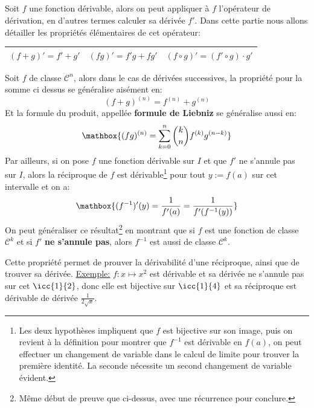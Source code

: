 \subsection*{}

Soit \(f\) une fonction dérivable, alors on peut appliquer à \(f\) l'opérateur de dérivation, en d'autres termes calculer sa dérivée \(f'\). Dans cette partie nous allons détailler les propriétés élémentaires de cet opérateur:
\begin{center}
   \renewcommand{\arraystretch}{1.5}%
   \begin{tabular}{| c | c | c |}
   \hline
   \((f + g)' = f' + g'\) & \((fg)' = f'g + fg'\)  & \((f \circ g)' = (f' \circ g) \cdot g'\) \\ [1ex]
   \hline
   \end{tabular}
\end{center}  
Soit \(f\) de classe \(\mathscr{C}^n\), alors dans le cas de dérivées successives, la propriété pour la somme ci dessus se généralise aisément en:
\[
   (f + g)^{(n)} = f^{(n)} + g^{(n)}
\]
Et la formule du produit, appellée \textbf{formule de Liebniz} se généralise aussi en:
\[
   \mathbox{(fg)^{(n)} = \sum_{k=0}^{n}\binom{k}{n}f^{(k)}g^{(n - k)} }
\]
Par ailleurs, si on pose \(f\) une fonction dérivable sur \(I\) et que \(f'\) ne s'annule pas sur \(I\), alors la réciproque de \(f\) est dérivable\footnote[1]{Les deux hypothèses impliquent que \(f\) est bijective sur son image, puis on revient à la définition pour montrer que \(f^{-1}\) est dérivable en \(f(a)\), on peut effectuer un changement de variable dans le calcul de limite pour trouver la première identité. La seconde nécessite un second changement de variable évident.} pour tout \(y := f(a)\) sur cet intervalle et on a:
\[
   \mathbox{(f^{-1})'(y) = \frac{1}{f'(a)} = \frac{1}{f'(f^{-1}(y))}}
\]
On peut généraliser ce résultat\footnote[2]{Même début de preuve que ci-dessus, avec une récurrence pour conclure.} en montrant que si \(f\) est une fonction de classe \(\mathscr{C}^k\) et si \(f'\) \textbf{ne s'annule pas}, alors \(f^{-1}\) est aussi de classe \(\mathscr{C}^k\).\<

Cette propriété permet de prouver la dérivabilité d'une réciproque, ainsi que de trouver sa dérivée.\+
\underline{Exemple:} \(f: x \mapsto x^2\) est dérivable et sa dérivée ne s'annule pas sur cet \(\icc{1}{2}\), donc elle est bijective sur \(\icc{1}{4}\) et sa réciproque est dérivable de dérivée \(\frac{1}{2\sqrt{x}}\).

